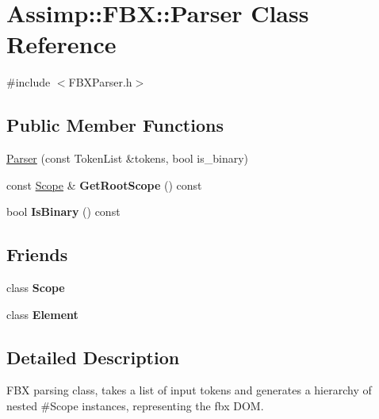 \hypertarget{class_assimp_1_1_f_b_x_1_1_parser}{\section{Assimp\+:\+:F\+B\+X\+:\+:Parser Class Reference}
\label{class_assimp_1_1_f_b_x_1_1_parser}
}


{\ttfamily \#include $<$F\+B\+X\+Parser.\+h$>$}

\subsection*{Public Member Functions}
\begin{DoxyCompactItemize}
\item 
\hyperlink{class_assimp_1_1_f_b_x_1_1_parser_a19608ccdf52beef8b494b89f477a5c70}{Parser} (const Token\+List \&tokens, bool is\+\_\+binary)
\item 
\hypertarget{class_assimp_1_1_f_b_x_1_1_parser_a535f7139e03ac9d33d22d2a2320b5e8d}{const \hyperlink{class_assimp_1_1_f_b_x_1_1_scope}{Scope} \& {\bfseries Get\+Root\+Scope} () const }\label{class_assimp_1_1_f_b_x_1_1_parser_a535f7139e03ac9d33d22d2a2320b5e8d}

\item 
\hypertarget{class_assimp_1_1_f_b_x_1_1_parser_acfd68801224db67574826596ae14ed6e}{bool {\bfseries Is\+Binary} () const }\label{class_assimp_1_1_f_b_x_1_1_parser_acfd68801224db67574826596ae14ed6e}

\end{DoxyCompactItemize}
\subsection*{Friends}
\begin{DoxyCompactItemize}
\item 
\hypertarget{class_assimp_1_1_f_b_x_1_1_parser_a921193447f6e42f596ac0a7694b02830}{class {\bfseries Scope}}\label{class_assimp_1_1_f_b_x_1_1_parser_a921193447f6e42f596ac0a7694b02830}

\item 
\hypertarget{class_assimp_1_1_f_b_x_1_1_parser_a016b821f88c7c0a2de1451c175cefbf9}{class {\bfseries Element}}\label{class_assimp_1_1_f_b_x_1_1_parser_a016b821f88c7c0a2de1451c175cefbf9}

\end{DoxyCompactItemize}


\subsection{Detailed Description}
F\+B\+X parsing class, takes a list of input tokens and generates a hierarchy of nested \#\+Scope instances, representing the fbx D\+O\+M. 

